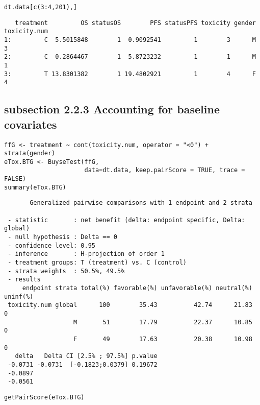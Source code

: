 \documentclass[12pt]{article}
\begin{document}
\lstset{language=r,label= ,caption= ,captionpos=b,numbers=none}
\begin{lstlisting}
dt.data[c(3:4,201),]
\end{lstlisting}

\begin{verbatim}
   treatment         OS statusOS        PFS statusPFS toxicity gender toxicity.num
1:         C  5.5015848        1  0.9092541         1        3      M            3
2:         C  0.2864467        1  5.8723232         1        1      M            1
3:         T 13.8301382        1 19.4802921         1        4      F            4
\end{verbatim}

\subsection{subsection 2.2.3 Accounting for baseline covariates}
\label{sec:org4cd7ef7}

\lstset{language=r,label= ,caption= ,captionpos=b,numbers=none}
\begin{lstlisting}
ffG <- treatment ~ cont(toxicity.num, operator = "<0") + strata(gender)
eTox.BTG <- BuyseTest(ffG,
                      data=dt.data, keep.pairScore = TRUE, trace = FALSE)
summary(eTox.BTG)
\end{lstlisting}

\begin{verbatim}
       Generalized pairwise comparisons with 1 endpoint and 2 strata

 - statistic       : net benefit (delta: endpoint specific, Delta: global) 
 - null hypothesis : Delta == 0 
 - confidence level: 0.95 
 - inference       : H-projection of order 1
 - treatment groups: T (treatment) vs. C (control) 
 - strata weights  : 50.5%, 49.5% 
 - results
     endpoint strata total(%) favorable(%) unfavorable(%) neutral(%) uninf(%)
 toxicity.num global      100        35.43          42.74      21.83        0
                   M       51        17.79          22.37      10.85        0
                   F       49        17.63          20.38      10.98        0
   delta   Delta CI [2.5% ; 97.5%] p.value 
 -0.0731 -0.0731  [-0.1823;0.0379] 0.19672 
 -0.0897                                   
 -0.0561
\end{verbatim}

\lstset{language=r,label= ,caption= ,captionpos=b,numbers=none}
\begin{lstlisting}
getPairScore(eTox.BTG)
\end{lstlisting}
\end{document}
